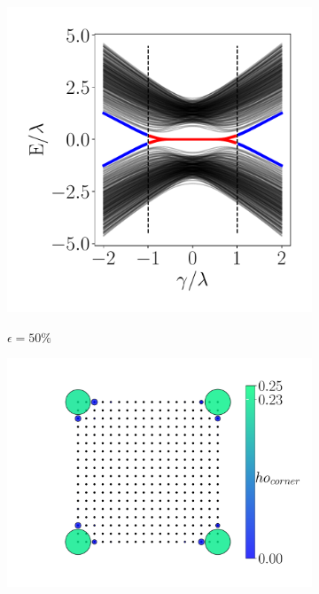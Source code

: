 \begin{figure}[h!]
     \begin{minipage}[h!]{0.7\textwidth}
         \begin{subfigure}[b!]{0.44 \textwidth}
             \caption{$\epsilon = 50\%$}
             \includegraphics[width=\textwidth]{Imagenes/Resultados_Hoti_Cuadrado/bands_square_shh_0.5.pdf}
             \label{}
         \end{subfigure}\hspace*{-0.5em}
         \begin{subfigure}[b!]{0.56 \textwidth}
             \caption*{}
             \includegraphics[width=\textwidth]{Imagenes/Resultados_Hoti_Cuadrado/proyection_square_0.5.pdf}
             \label{}
         \end{subfigure}\hspace*{-0.5em}
     \end{minipage}\vspace*{-2em}
     

\end{figure}
